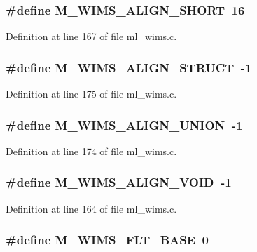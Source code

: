\subsubsection{\setlength{\rightskip}{0pt plus 5cm}\#define M\_\-WIMS\_\-ALIGN\_\-SHORT~16}\label{ml__wims_8c_9d0f96c41726956269fefabd7d200e6e}




Definition at line 167 of file ml\_\-wims.c.
\subsubsection{\setlength{\rightskip}{0pt plus 5cm}\#define M\_\-WIMS\_\-ALIGN\_\-STRUCT~-1}\label{ml__wims_8c_151108b9e9c48be1fd46db7e427a81e6}




Definition at line 175 of file ml\_\-wims.c.
\subsubsection{\setlength{\rightskip}{0pt plus 5cm}\#define M\_\-WIMS\_\-ALIGN\_\-UNION~-1}\label{ml__wims_8c_eca7cc7c543fbc1736fb1cdfa3205919}




Definition at line 174 of file ml\_\-wims.c.
\subsubsection{\setlength{\rightskip}{0pt plus 5cm}\#define M\_\-WIMS\_\-ALIGN\_\-VOID~-1}\label{ml__wims_8c_79e870bb3815d07e5bcbdb192cb658bc}




Definition at line 164 of file ml\_\-wims.c.
\subsubsection{\setlength{\rightskip}{0pt plus 5cm}\#define M\_\-WIMS\_\-FLT\_\-BASE~0}\label{ml__wims_8c_f195dada5fa432152535d721d766841b}




